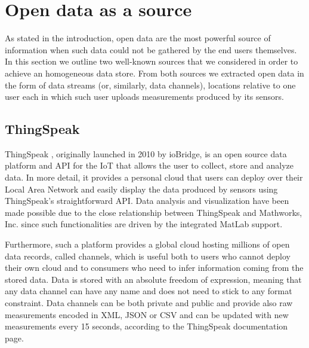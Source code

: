 \section{Open data as a source}
\label{sec:open}

As stated in the introduction, open data are the most powerful source of information when such data could not be gathered by the end users themselves.
In this section we outline two well-known sources that we considered in order to achieve an homogeneous data store.
From both sources we extracted open data in the form of data streams (or, similarly, data channels), locations relative to one user each in which such user uploads measurements produced by its sensors.

\subsection{ThingSpeak}
ThingSpeak \cite{thingspeak}, originally launched in 2010 by ioBridge, is an open source data platform and API for the IoT that allows the user to collect, store and analyze data.
In more detail, it provides a personal cloud that users can deploy over their Local Area Network and easily display the data produced by sensors using ThingSpeak's straightforward API.
Data analysis and visualization have been made possible due to the close relationship between ThingSpeak and Mathworks, Inc. since such functionalities are driven by the integrated MatLab support. 

Furthermore, such a platform provides a global cloud hosting millions of open data records, called channels, which is useful both to users who cannot deploy their own cloud and to consumers who need to infer information coming from the stored data.
Data is stored with an absolute freedom of expression, meaning that any data channel can have any name and does not need to stick to any format constraint.
Data channels can be both private and public and provide also raw measurements encoded in XML, JSON or CSV and can be updated with new measurements every 15 seconds, according to the ThingSpeak documentation page.

